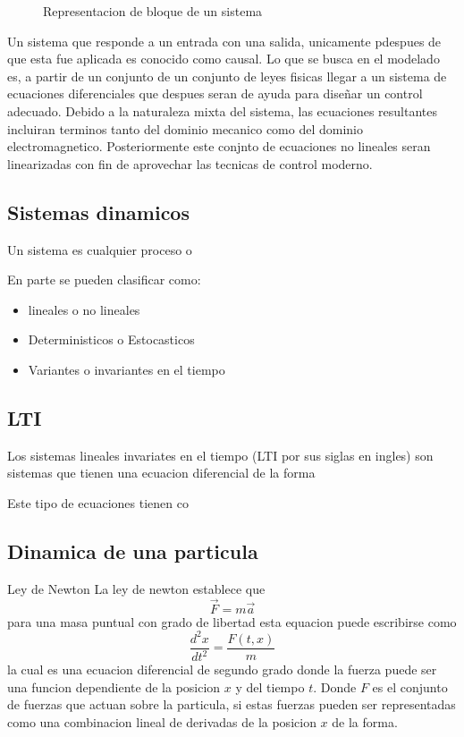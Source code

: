 \begin{figure}
\begin{center}
\centering
\caption{Representacion de bloque de un sistema}
\end{center}
\end{figure}

Un sistema que responde a un entrada con una salida, unicamente pdespues de que esta fue aplicada es conocido como causal.
Lo que se busca en el modelado es, a partir de un conjunto de un 
conjunto de leyes fisicas llegar a un sistema de ecuaciones diferenciales que despues 
seran de ayuda para diseñar un control adecuado. Debido a la naturaleza mixta del 
sistema, las ecuaciones resultantes incluiran terminos tanto del dominio mecanico como 
del dominio electromagnetico. Posteriormente este conjnto de ecuaciones no lineales seran linearizadas con fin de aprovechar las tecnicas de control moderno.


\subsection{Sistemas dinamicos}
Un sistema es cualquier proceso o 

En parte se pueden clasificar como:
\begin{itemize}
\item lineales o no lineales
\item Deterministicos o Estocasticos
\item Variantes o invariantes en el tiempo
\end{itemize}

\subsection[1]{LTI}
Los sistemas lineales invariates en el tiempo (LTI por sus siglas en ingles) son sistemas que tienen una ecuacion diferencial de la forma


Este tipo de ecuaciones tienen co
\subsection{Dinamica de una particula}

Ley de Newton
La ley de newton establece que 
$$ \vec{F} = m\vec{a} $$
para una masa puntual con grado de libertad esta equacion puede
escribirse como
$$ \frac{d^2x}{dt^2}=\frac{F(t,x)}{m}$$
la cual es una ecuacion diferencial de segundo grado donde la fuerza puede ser una
funcion dependiente de la posicion $x$ y del tiempo $t$.
Donde $F$ es el conjunto de fuerzas que actuan sobre la particula, si estas fuerzas pueden ser representadas como una combinacion lineal de derivadas de la posicion $x$ de la forma.

